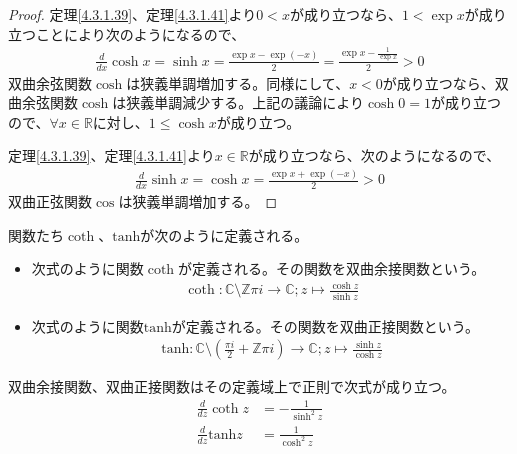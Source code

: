\documentclass[dvipdfmx]{jsarticle}
\begin{document}
\begin{proof} 定理\ref{4.3.1.39}、定理\ref{4.3.1.41}より$0 < x$が成り立つなら、$1 < \exp x$が成り立つことにより次のようになるので、
\begin{align*}
\frac{d}{dx}\cosh x = \sinh x = \frac{\exp x - \exp( - x)}{2} = \frac{\exp x - \frac{1}{\exp x}}{2} > 0
\end{align*}
双曲余弦関数$\cosh$は狭義単調増加する。同様にして、$x < 0$が成り立つなら、双曲余弦関数$\cosh$は狭義単調減少する。上記の議論により$\cosh 0 = 1$が成り立つので、$\forall x \in \mathbb{R}$に対し、$1 \leq \cosh x$が成り立つ。\par
定理\ref{4.3.1.39}、定理\ref{4.3.1.41}より$x \in \mathbb{R}$が成り立つなら、次のようになるので、
\begin{align*}
\frac{d}{dx}\sinh x = \cosh x = \frac{\exp x + \exp( - x)}{2} > 0
\end{align*}
双曲正弦関数$\cos$は狭義単調増加する。
\end{proof}
\begin{dfn} 関数たち$\coth$、$\mathrm{tanh}$が次のように定義される。
\begin{itemize}
\item
  次式のように関数$\coth$が定義される。その関数を双曲余接関数という。
\begin{align*}
\coth:\mathbb{C} \setminus \mathbb{Z}\pi i \rightarrow \mathbb{C};z \mapsto \frac{\cosh z}{\sinh z}
\end{align*}
\item
  次式のように関数$\mathrm{tanh}$が定義される。その関数を双曲正接関数という。
\begin{align*}
\mathrm{tanh}:\mathbb{C} \setminus \left( \frac{\pi i}{2} + \mathbb{Z}\pi i \right) \rightarrow \mathbb{C};z \mapsto \frac{\sinh z}{\cosh z}
\end{align*}
\end{itemize}
\end{dfn}
\begin{thm}\label{4.3.1.44}
双曲余接関数、双曲正接関数はその定義域上で正則で次式が成り立つ。
\begin{align*}
\frac{d}{dz}\coth z &= - \frac{1}{\sinh^{2}z}\\
\frac{d}{dz}\mathrm{tanh} z &= \frac{1}{\cosh^{2}z}
\end{align*}
\end{thm}
\end{document}
